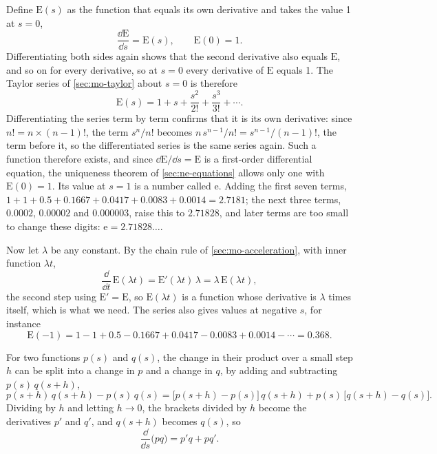 \begin{toolbox}
Define $\mathrm{E}(s)$ as the function that equals its own derivative and
takes the value 1 at $s = 0$,
\begin{equation*}
   \frac{\dd\mathrm{E}}{\dd s} = \mathrm{E}(s), \qquad \mathrm{E}(0) = 1 .
\end{equation*}
Differentiating both sides again shows that the second derivative also
equals $\mathrm{E}$, and so on for every derivative, so at $s = 0$ every
derivative of $\mathrm{E}$ equals 1. The Taylor series of
\cref{sec:mo-taylor} about $s = 0$ is therefore
\begin{equation*}
   \mathrm{E}(s) = 1 + s + \frac{s^2}{2!} + \frac{s^3}{3!} + \dotsb .
\end{equation*}
Differentiating the series term by term confirms that it is its own
derivative: since $n! = n\times(n-1)!$, the term $s^n/n!$ becomes
$n\,s^{n-1}/n! = s^{n-1}/(n-1)!$, the term before it, so the
differentiated series is the same series again. Such a function
therefore exists, and since $\dd\mathrm{E}/\dd s = \mathrm{E}$ is a
first-order differential equation, the uniqueness theorem of
\cref{sec:ne-equations} allows only one with $\mathrm{E}(0) = 1$.
Its value at $s = 1$ is a number called $\mathrm{e}$. Adding the first
seven terms, $1 + 1 + 0.5 + 0.1667 + 0.0417 + 0.0083 + 0.0014 = 2.7181$;
the next three terms, $0.0002$, $0.00002$ and $0.000003$, raise this to
$2.71828$, and later terms are too small to change these digits:
$\mathrm{e} = 2.71828\ldots$.

Now let $\lambda$ be any constant. By the chain rule of
\cref{sec:mo-acceleration}, with inner function $\lambda t$,
\begin{equation*}
   \frac{\dd}{\dd t}\,\mathrm{E}(\lambda t)
   = \mathrm{E}'(\lambda t)\,\lambda = \lambda\,\mathrm{E}(\lambda t) ,
\end{equation*}
the second step using $\mathrm{E}' = \mathrm{E}$,
so $\mathrm{E}(\lambda t)$ is a function whose derivative is $\lambda$
times itself, which is what we need. The series also gives values at
negative $s$, for instance
\begin{equation*}
   \mathrm{E}(-1) = 1 - 1 + 0.5 - 0.1667 + 0.0417 - 0.0083 + 0.0014 - \dotsb
   = 0.368 .
\end{equation*}
\end{toolbox}

\begin{toolbox}
For two functions $p(s)$ and $q(s)$, the change in their product over a
small step $h$ can be split into a change in $p$ and a change in $q$, by
adding and subtracting $p(s)\,q(s+h)$,
\begin{equation*}
   p(s+h)\,q(s+h) - p(s)\,q(s)
   = \bigl[p(s+h) - p(s)\bigr]\,q(s+h) + p(s)\,\bigl[q(s+h) - q(s)\bigr] .
\end{equation*}
Dividing by $h$ and letting $h \to 0$, the brackets divided by $h$ become
the derivatives $p'$ and $q'$, and $q(s+h)$ becomes $q(s)$, so
\begin{equation*}
   \frac{\dd}{\dd s}\bigl(pq\bigr) = p'q + pq' .
\end{equation*}
\end{toolbox}

